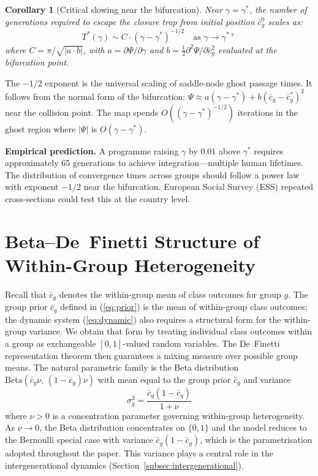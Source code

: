 \documentclass[pdflatex,sn-basic]{sn-jnl}
\theoremstyle{thmstyleone}
\newtheorem{corollary}[proposition]{Corollary}
\numberwithin{proposition}{subsection}
\begin{document}
\begin{corollary}[Critical slowing near the bifurcation]
\label{cor:Tstar}
Near $\gamma = \gamma^*$, the number of generations required to
escape the closure trap from initial position $\bar{c}_g^0$ scales as:
\begin{equation}
  T^*(\gamma) \sim C \cdot (\gamma - \gamma^*)^{-1/2}
  \quad \text{as } \gamma \to \gamma^{*+}
  \label{eq:Tstar}
\end{equation}
where $C = \pi / \sqrt{|a \cdot b|}$, with $a = \partial \Psi /
\partial \gamma$ and $b = \frac{1}{2}\partial^2 \Psi / \partial
\bar{c}_g^2$ evaluated at the bifurcation point.
\end{corollary}

The $-1/2$ exponent is the universal scaling of saddle-node ghost
passage times. It follows from the normal form of the bifurcation:
$\Psi \approx a(\gamma - \gamma^*) + b(\bar{c}_g - \bar{c}_g^*)^2$ near the
collision point. The map spends $O((\gamma - \gamma^*)^{-1/2})$
iterations in the ghost region where $|\Psi|$ is $O(\gamma - \gamma^*)$.

\textbf{Empirical prediction.} A programme raising $\gamma$ by $0.01$
above $\gamma^*$ requires approximately 65 generations to achieve
integration---multiple human lifetimes. The distribution of
convergence times across groups should follow a power law with
exponent $-1/2$ near the bifurcation. European Social Survey (ESS)
repeated cross-sections could test this at the country level.

\section{Beta--De~Finetti Structure of Within-Group Heterogeneity}
\label{app:bernoulli}

Recall that $\bar{c}_g$ denotes the within-group mean of class
outcomes for group $g$. The group prior $\bar{c}_g$ defined in
(\ref{eq:prior}) is the mean
of within-group class outcomes; the dynamic system
(\ref{eq:dynamic}) also requires a structural form for the
within-group variance. We obtain that form by treating individual
class outcomes within a group as exchangeable $[0,1]$-valued random
variables. The De~Finetti representation theorem
\citep{DeFinetti1964} then guarantees a mixing measure over possible
group means. The natural parametric family is the Beta distribution
$\mathrm{Beta}(\bar{c}_g \nu,\,(1 - \bar{c}_g)\nu)$ with mean equal
to the group prior $\bar{c}_g$ and variance
\begin{equation}
  \sigma_g^2 = \frac{\bar{c}_g(1 - \bar{c}_g)}{1 + \nu}
  \label{eq:beta-var}
\end{equation}
where $\nu > 0$ is a concentration parameter governing within-group
heterogeneity. As $\nu \to 0$, the Beta distribution concentrates
on $\{0,1\}$ and the model reduces to the Bernoulli special case
with variance $\bar{c}_g(1-\bar{c}_g)$, which is the parametrisation
adopted throughout the paper. This variance plays a central role in
the intergenerational dynamics
(Section~\ref{subsec:intergenerational}).
\end{document}
